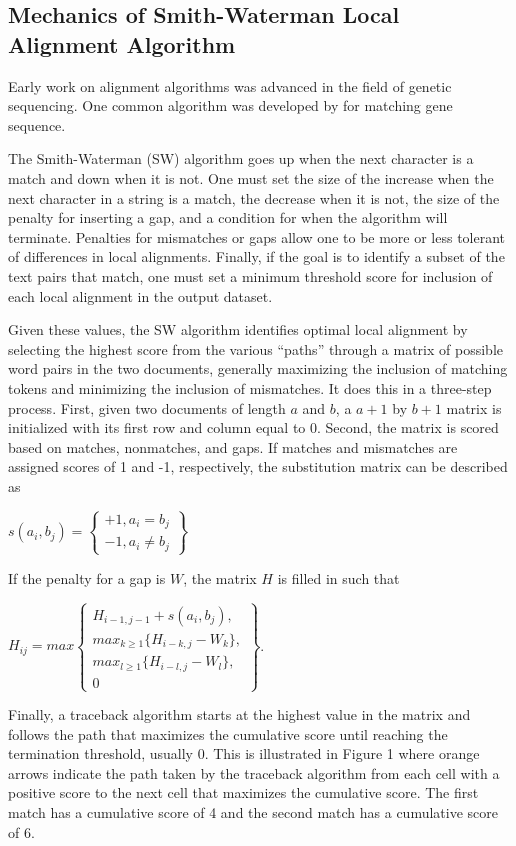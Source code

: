 \documentclass{article}
\begin{document}
\subsection{Mechanics of Smith-Waterman Local Alignment Algorithm}

Early work on alignment algorithms was advanced in the field of genetic sequencing. One common algorithm was developed by \citet{Smith1981} for matching gene sequence. 

The Smith-Waterman (SW) algorithm goes up when the next character is a match and down when it is not. One must set the size of the increase when the next character in a string is a match, the decrease when it is not, the size of the penalty for inserting a gap, and a condition for when the algorithm will terminate. Penalties for mismatches or gaps allow one to be more or less tolerant of differences in local alignments. Finally, if the goal is to identify a subset of the text pairs that match, one must set a minimum threshold score for inclusion of each local alignment in the output dataset. 

Given these values, the SW algorithm identifies optimal local alignment by selecting the highest score from the various ``paths'' through a matrix of possible word pairs in the two documents, generally maximizing the inclusion of matching tokens and minimizing the inclusion of mismatches. It does this in a three-step process. First, given two documents of length $a$ and $b$, a $a+1$ by $b+1$ matrix is initialized with its first row and column equal to 0. Second, the matrix is scored based on matches, nonmatches, and gaps. If matches and mismatches are assigned scores of 1 and -1, respectively, the substitution matrix can be described as

$s(a_i, b_j) = \begin{Bmatrix} +1, a_i = b_j\\ -1, a_i \neq b_j \end{Bmatrix}$ 


If the penalty for a gap is $W$, the matrix $H$ is filled in such that

$H_{ij} = max \begin{Bmatrix}H_{i-1,j-1} + s(a_i, b_j),\\ max_{k\geq 1} \{H_{i-k,j} - W_k\},\\ max_{l\geq 1} \{H_{i-l,j} - W_l\},\\0 \end{Bmatrix}$. 

Finally,  a traceback algorithm starts at the highest value in the matrix and follows the path that maximizes the cumulative score until reaching the termination threshold, usually 0. This is illustrated in Figure 1 where orange arrows indicate the path taken by the traceback algorithm from each cell with a positive score to the next cell that maximizes the cumulative score. The first match has a cumulative score of 4 and the second match has a cumulative score of 6.
\end{document}
